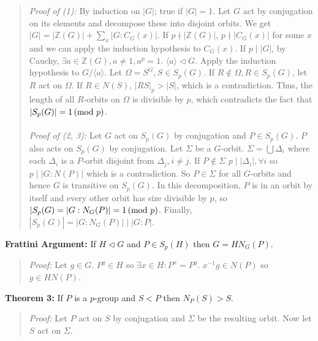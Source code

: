 \begin{quote}
\emph{Proof of (1):}  By induction on $|G|$; true if $|G|=1$.
Let $G$ act by conjugation on its elements and decompose these into disjoint orbits.  We get
$|G|= |{\mathbb Z}(G)|+\sum_{x} |G:C_G(x)|$.  If $p \nmid |{\mathbb Z}(G)|$, $p \nmid |C_G(x)|$
for some $x$ and we can apply the induction hypothesis to $C_G(x)$.  If $p \mid |G|$, by Cauchy,
$\exists a \in {\mathbb Z}(G), a \ne 1, a^p =1$.  $\langle a \rangle \lhd G$.  
Apply the induction hypothesis to $G/ \langle a \rangle$.  Let $\Omega = S^G, S \in S_p(G)$.
If $R \notin \Omega, R \in S_p(G)$, let $R$ act on $\Omega$. If $R \in N(S)$, $|RS|_p > |S|$,
which is a contradiction. Thus, the length of all $R$-orbits on $\Omega$ is divisible by $p$,
which contradicts the fact that $|S_p(G)| = 1 \thinspace \textnormal{(mod } p \textnormal{)}$.
\\
\\
\emph{Proof of (2, 3):}
Let $G$ act on $S_p(G)$ by conjugation and $P \in S_p(G)$.  $P$ also acts on $S_p(G)$ by
conjugation.  Let $\Sigma$ be a $G$-orbit.  $\Sigma= \bigcup \Delta_i$ where each
$\Delta_i$ is a $P$-orbit disjoint from $\Delta_j, i \ne j$.  If $P \notin \Sigma$
$p \mid |\Delta_i|, \forall i$ so $p \mid |G:N(P)|$ which is a contradiction.  So $P \in \Sigma$ for
all $G$-orbits and hence $G$ is transitive on $S_p(G)$.  In this decomposition, $P$ is in an orbit
by itself and every other orbit has size divisible by $p$, so $|S_p(G)= |G:N_G(P)| = 1 \thinspace \textnormal{(mod } p \textnormal{)}$.
Finally,
$|S_p(G)| = |G:N_G(P)| \mid |G:P|$.
\end{quote}
{\bf Frattini Argument:} If $H \lhd G$ and $P \in S_p(H)$ then $G= H N_G(P)$.
\begin{quote}
\emph{Proof:}  Let $g \in G$.  $P^g \in H$ so $\exists x \in H: P^x=P^g$.  $x^{-1}g \in N(P)$ so
$g \in HN(P)$.
\end{quote}
{\bf Theorem 3:} If $P$ is a $p$-group and $S < P$ then $N_P(S) > S$.
\begin{quote}
\emph{Proof:}  Let $P$ act on $S$ by conjugation and $\Sigma$ be the resulting orbit.
Now let $S$ act on $\Sigma$.
\end{quote}

